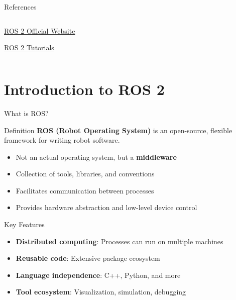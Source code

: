 \begin{frame}{References}
\begin{columns}[c]
\begin{column}{.45\textwidth}
            \vspace{0.3cm}

            \href{https://www.ros.org/}{ROS 2 Official Website}

            \vspace{0.3cm}

            \href{https://github.com/ros2/ros2_documentation}{ROS 2 Tutorials}
        \end{column}
    \end{columns}
\end{frame}

\section{Introduction to ROS 2}

\begin{frame}{What is ROS?}
    \begin{block}{Definition}
        \textbf{ROS (Robot Operating System)} is an open-source, flexible framework for writing robot software.
        \begin{itemize}
            \item Not an actual operating system, but a \textbf{middleware}
            \item Collection of tools, libraries, and conventions
            \item Facilitates communication between processes
            \item Provides hardware abstraction and low-level device control
        \end{itemize}
    \end{block}

    \begin{block}{Key Features}
        \begin{itemize}
            \item \textbf{Distributed computing}: Processes can run on multiple machines
            \item \textbf{Reusable code}: Extensive package ecosystem
            \item \textbf{Language independence}: C++, Python, and more
            \item \textbf{Tool ecosystem}: Visualization, simulation, debugging
        \end{itemize}
    \end{block}
\end{frame}

